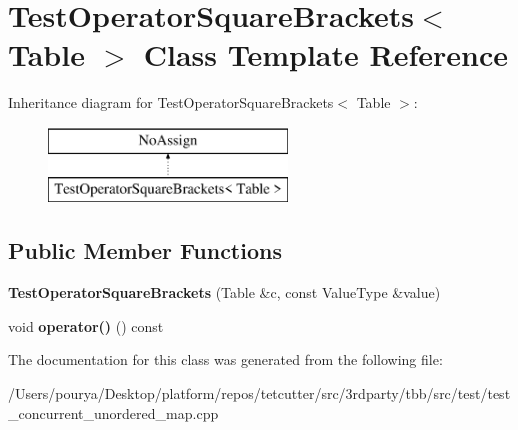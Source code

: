 \hypertarget{classTestOperatorSquareBrackets}{}\section{Test\+Operator\+Square\+Brackets$<$ Table $>$ Class Template Reference}
\label{classTestOperatorSquareBrackets}
Inheritance diagram for Test\+Operator\+Square\+Brackets$<$ Table $>$\+:\begin{figure}[H]
\begin{center}
\leavevmode
\includegraphics[height=2.000000cm]{classTestOperatorSquareBrackets}
\end{center}
\end{figure}
\subsection*{Public Member Functions}
\begin{DoxyCompactItemize}
\item 
\hypertarget{classTestOperatorSquareBrackets_a7e25198fca1cced5b05540fa9c6bf328}{}{\bfseries Test\+Operator\+Square\+Brackets} (Table \&c, const Value\+Type \&value)\label{classTestOperatorSquareBrackets_a7e25198fca1cced5b05540fa9c6bf328}

\item 
\hypertarget{classTestOperatorSquareBrackets_a4e655eb1eb9b6585163bd7c25915c695}{}void {\bfseries operator()} () const \label{classTestOperatorSquareBrackets_a4e655eb1eb9b6585163bd7c25915c695}

\end{DoxyCompactItemize}


The documentation for this class was generated from the following file\+:\begin{DoxyCompactItemize}
\item 
/\+Users/pourya/\+Desktop/platform/repos/tetcutter/src/3rdparty/tbb/src/test/test\+\_\+concurrent\+\_\+unordered\+\_\+map.\+cpp\end{DoxyCompactItemize}
